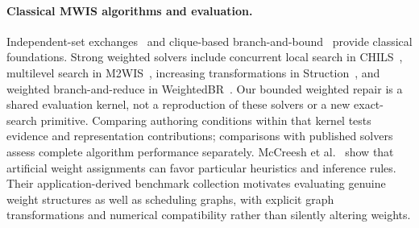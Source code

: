 \paragraph{Classical MWIS algorithms and evaluation.}
Independent-set exchanges~\cite{andrade2012local} and clique-based
branch-and-bound~\cite{ostergard2002clique} provide classical foundations.
Strong weighted solvers include concurrent local search in
CHILS~\cite{grossmann2025chils}, multilevel search in
M2WIS~\cite{grossmann2024mmwis}, increasing transformations in
Struction~\cite{gellner2021struction}, and weighted branch-and-reduce in
WeightedBR~\cite{lamm2019weighted}. Our bounded weighted repair is a shared
evaluation kernel, not a reproduction of these solvers or a new exact-search
primitive. Comparing authoring conditions within that kernel tests evidence
and representation contributions; comparisons with published solvers assess
complete algorithm performance separately. McCreesh et
al.~\cite{mccreesh2017evaluation} show that artificial weight assignments can
favor particular heuristics and inference rules. Their application-derived
benchmark collection motivates evaluating genuine weight structures as well
as scheduling graphs, with explicit graph transformations and numerical
compatibility rather than silently altering weights.
